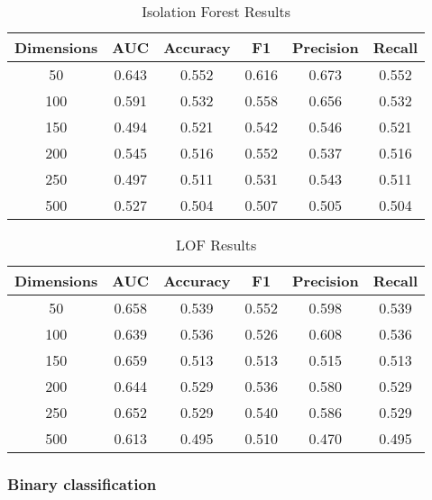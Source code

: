 \documentclass{article}
\begin{document}
\begin{table}
 \caption{Isolation Forest Results}
  \centering
  \begin{tabular}{|c|c|c|c|c|c|}
    \hline
    \rowcolor{lightgray} \textbf{Dimensions} & \textbf{AUC} & \textbf{Accuracy} & \textbf{F1} & \textbf{Precision} & \textbf{Recall} \\
    \hline
    \rowcolor{green} 50 & 0.643 & 0.552 & 0.616 & 0.673 & 0.552 \\
    \hline
    100 & 0.591 & 0.532 & 0.558 & 0.656 & 0.532 \\
    \hline
    150 & 0.494 & 0.521 & 0.542 & 0.546 & 0.521 \\
    \hline
    200 & 0.545 & 0.516 & 0.552 & 0.537 & 0.516 \\
    \hline
    250 & 0.497 & 0.511 & 0.531 & 0.543 & 0.511 \\
    \hline
    500 & 0.527 & 0.504 & 0.507 & 0.505 & 0.504 \\
    \hline
  \end{tabular}
  \label{tab:iforest}
\end{table}

\begin{table}
 \caption{LOF Results}
  \centering
  \begin{tabular}{|c|c|c|c|c|c|}
    \hline
    \rowcolor{lightgray} \textbf{Dimensions} & \textbf{AUC} & \textbf{Accuracy} & \textbf{F1} & \textbf{Precision} & \textbf{Recall} \\
    \hline
    \cellcolor{green} 50 & 0.658 & \cellcolor{green} 0.539 & \cellcolor{green} 0.552 & 0.598 & \cellcolor{green} 0.539 \\
    \hline
    100 & 0.639 & 0.536 & 0.526 & \cellcolor{green} 0.608 & 0.536 \\
    \hline
    150 & \cellcolor{green} 0.659 & 0.513 & 0.513 & 0.515 & 0.513 \\
    \hline
    200 & 0.644 & 0.529 & 0.536 & 0.580 & 0.529 \\
    \hline
    250 & 0.652 & 0.529 & 0.540 & 0.586 & 0.529 \\
    \hline
    500 & 0.613 & 0.495 & 0.510 & 0.470 & 0.495 \\
    \hline
  \end{tabular}
  \label{tab:lof}
\end{table}

\hypertarget{binary-classification}{%
\subsubsection{Binary classification}\label{binary-classification}}
\end{document}
